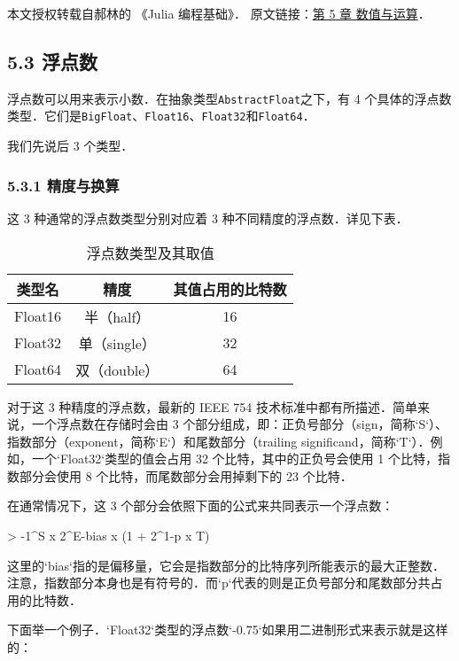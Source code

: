 
本文授权转载自郝林的 《Julia 编程基础》． 原文链接：\href{https://github.com/hyper0x/JuliaBasics/blob/master/book/ch05.md}{第 5 章 数值与运算}．


\subsection{5.3 浮点数}

浮点数可以用来表示小数．在抽象类型\verb|AbstractFloat|之下，有 4 个具体的浮点数类型．它们是\verb|BigFloat|、\verb|Float16|、\verb|Float32|和\verb|Float64|．

我们先说后 3 个类型．

\subsubsection{5.3.1 精度与换算}

这 3 种通常的浮点数类型分别对应着 3 种不同精度的浮点数．详见下表．

\begin{table}[ht]
\centering
\caption{浮点数类型及其取值}\label{JuC5S3_tab1}
\begin{tabular}{|c|c|c|}
\hline
类型名 & 精度 & 其值占用的比特数 \\
\hline
Float16 & 半（half） & 16 \\
\hline
Float32 & 单（single） & 32 \\
\hline
Float64 & 双（double） & 64 \\
\hline
\end{tabular}
\end{table}

对于这 3 种精度的浮点数，最新的 IEEE 754 技术标准中都有所描述．简单来说，一个浮点数在存储时会由 3 个部分组成，即：正负号部分（sign，简称`S`）、指数部分（exponent，简称`E`）和尾数部分（trailing significand，简称`T`）．例如，一个`Float32`类型的值会占用 32 个比特，其中的正负号会使用 1 个比特，指数部分会使用 8 个比特，而尾数部分会用掉剩下的 23 个比特．

在通常情况下，这 3 个部分会依照下面的公式来共同表示一个浮点数：

> -1^S x 2^E-bias x (1 + 2^1-p x T)

这里的`bias`指的是偏移量，它会是指数部分的比特序列所能表示的最大正整数．注意，指数部分本身也是有符号的．而`p`代表的则是正负号部分和尾数部分共占用的比特数．

下面举一个例子．`Float32`类型的浮点数`-0.75`如果用二进制形式来表示就是这样的：

